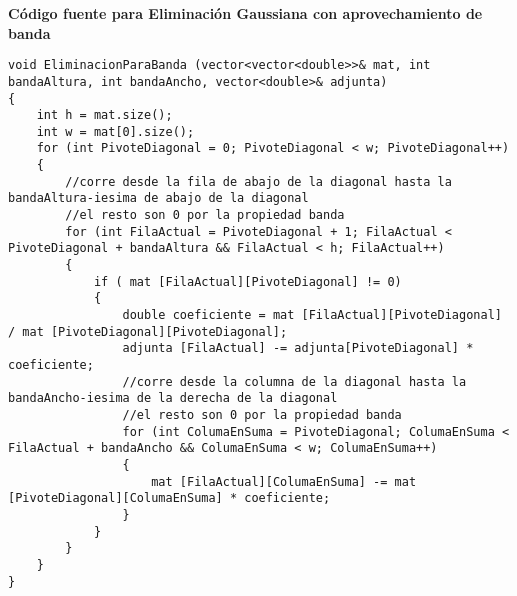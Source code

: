 \textbf{}
\textbf{Código fuente para Eliminación Gaussiana con aprovechamiento de banda}
\textbf{}

\lstset{language=C++, breaklines=true, basicstyle=\footnotesize}
\begin{lstlisting}[frame=single]
void EliminacionParaBanda (vector<vector<double>>& mat, int bandaAltura, int bandaAncho, vector<double>& adjunta)
{
    int h = mat.size();
    int w = mat[0].size();
    for (int PivoteDiagonal = 0; PivoteDiagonal < w; PivoteDiagonal++)
    {
        //corre desde la fila de abajo de la diagonal hasta la bandaAltura-iesima de abajo de la diagonal
        //el resto son 0 por la propiedad banda
        for (int FilaActual = PivoteDiagonal + 1; FilaActual < PivoteDiagonal + bandaAltura && FilaActual < h; FilaActual++)
        {
            if ( mat [FilaActual][PivoteDiagonal] != 0)
            {
                double coeficiente = mat [FilaActual][PivoteDiagonal] / mat [PivoteDiagonal][PivoteDiagonal];
                adjunta [FilaActual] -= adjunta[PivoteDiagonal] * coeficiente;
                //corre desde la columna de la diagonal hasta la bandaAncho-iesima de la derecha de la diagonal
                //el resto son 0 por la propiedad banda
                for (int ColumaEnSuma = PivoteDiagonal; ColumaEnSuma < FilaActual + bandaAncho && ColumaEnSuma < w; ColumaEnSuma++)
                {
                    mat [FilaActual][ColumaEnSuma] -= mat [PivoteDiagonal][ColumaEnSuma] * coeficiente;
                }
            }
        }
    }
}
\end{lstlisting}